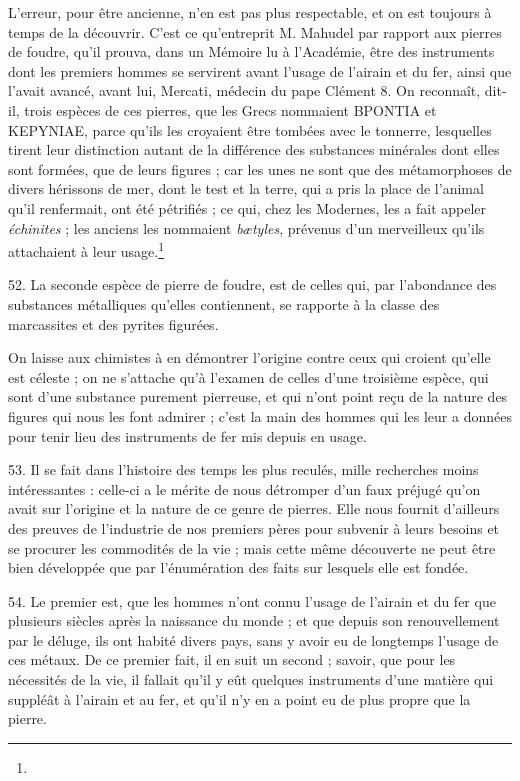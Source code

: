 \documentclass[a4paper, 11pt, oneside, polutonikogreek, french]{article}
\begin{document}
\og L'erreur, pour être ancienne, n'en est pas plus respectable, et on est toujours à temps de la découvrir. C'est ce qu'entreprit M. Mahudel par rapport aux pierres de foudre, qu'il prouva, dans un Mémoire lu à l'Académie, être des instruments dont les premiers hommes se servirent avant l'usage de l'airain et du fer, ainsi que l'avait avancé, avant lui, Mercati, médecin du pape Clément 8. On reconnaît, dit-il, trois espèces de ces pierres, que les Grecs nommaient BPONTIA et KEPYNIAE, parce qu'ils les croyaient être tombées avec le tonnerre, lesquelles tirent leur distinction autant de la différence des substances minérales dont elles sont formées, que de leurs figures ; car les unes ne sont que des métamorphoses de divers hérissons de mer, dont le test et la terre, qui a pris la place de l'animal qu'il renfermait, ont été pétrifiés ; ce qui, chez les Modernes, les a fait appeler \emph{échinites} ; les anciens les nommaient \emph{bætyles}, prévenus d'un merveilleux qu'ils attachaient à leur usage.\footnote{} \fg

52. La seconde espèce de pierre de foudre, est de celles qui, par l'abondance des substances métalliques qu'elles contiennent, se rapporte à la classe des marcassites et des pyrites figurées.

On laisse aux chimistes à en démontrer l'origine contre ceux qui croient qu'elle est céleste ; on ne s'attache qu'à l'examen de celles d'une troisième espèce, qui sont d'une substance purement pierreuse, et qui n'ont point reçu de la nature des figures qui nous les font admirer ; c'est la main des hommes qui les leur a données pour tenir lieu des instruments de fer mis depuis en usage.

53. Il se fait dans l'histoire des temps les plus reculés, mille recherches moins intéressantes : celle-ci a le mérite de nous détromper d'un faux préjugé qu'on avait sur l'origine et la nature de ce genre de pierres. Elle nous fournit d'ailleurs des preuves de l'industrie de nos premiers pères pour subvenir à leurs besoins et se procurer les commodités de la vie ; mais cette même découverte ne peut être bien développée que par l'énumération des faits sur lesquels elle est fondée.

54. Le premier est, que les hommes n'ont connu l'usage de l'airain et du fer que plusieurs siècles après la naissance du monde ; et que depuis son renouvellement par le déluge, ils ont habité divers pays, sans y avoir eu de longtemps l'usage de ces métaux. De ce premier fait, il en suit un second ; savoir, que pour les nécessités de la vie, il fallait qu'il y eût quelques instruments d'une matière qui suppléât à l'airain et au fer, et qu'il n'y en a point eu de plus propre que la pierre.
\end{document}
